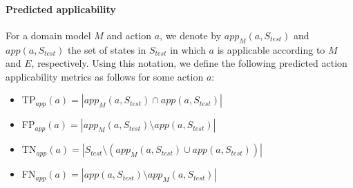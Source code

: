 \documentclass{article}
\theoremstyle{definition}
\theoremstyle{remark}
\newcommand{\stest}{\ensuremath{S_{\textit{test}}}\xspace}
\newcommand{\app}{\ensuremath{\textit{app}}\xspace}
\newif\ifaddcomments
\newcommand{\roni}[1]{\ifaddcomments{\textcolor{red}{[Roni: #1]}}\fi}
\newcommand{\gregor}[1]{\ifaddcomments{\textcolor{orange}{[Gregor: #1]}}\fi}
\newcommand{\leo}[1]{\ifaddcomments{\textcolor{pink}{[Leonardo: #1]}}\fi}
\newcommand{\pascalJr}[1]{\ifaddcomments{\textcolor{cyan}{[Pascal L.: {#1}]}}\fi}
\begin{document}
\paragraph{Predicted applicability}
For a domain model $M$ and action $a$, we denote by $\app_M(a,\stest)$ and $\app(a,\stest)$ the set of states in \stest 
in which $a$ is applicable according to $M$ and $E$, respectively. 
Using this notation, we define the following predicted action applicability metrics as follows for some action $a$:
\begin{itemize}
    \item TP$_{\app}(a)=|\app_M(a,\stest)\cap \app(a,\stest)|$
    \item FP$_{\app}(a)=|\app_M(a,\stest)\setminus \app(a,\stest)|$ 
    \item TN$_{\app}(a)=|\stest\setminus (\app_M(a,\stest)\cup \app(a,\stest))|$
    \item FN$_{\app}(a)=|\app(a,\stest)\setminus \app_M(a,\stest)|$
\end{itemize}
\end{document}
